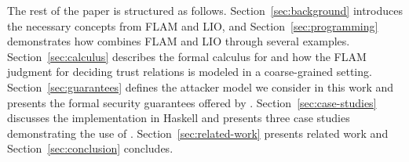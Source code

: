 The rest of the paper is structured as follows. Section~\ref{sec:background} introduces the necessary concepts from FLAM and LIO, and Section~\ref{sec:programming} demonstrates how \lang{} combines FLAM and LIO through several examples. Section~\ref{sec:calculus} describes the formal calculus for \lang{} and how the FLAM judgment for deciding trust relations is modeled in a coarse-grained setting. Section~\ref{sec:guarantees} defines the attacker model we consider in this work and presents the formal security guarantees offered by \lang. Section~\ref{sec:case-studies} discusses the implementation in Haskell and presents three case studies demonstrating the use of \lang. Section~\ref{sec:related-work} presents related work and Section~\ref{sec:conclusion} concludes.